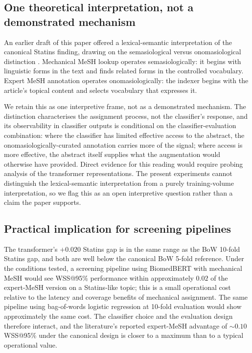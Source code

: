 \documentclass{article}
\begin{document}
\subsection{One theoretical interpretation, not a demonstrated mechanism}\label{sec:lexical}

An earlier draft of this paper offered a lexical-semantic interpretation of the canonical Statins finding, drawing on the semasiological versus onomasiological distinction \cite{baldinger1980,geeraerts2010}. Mechanical MeSH lookup operates semasiologically: it begins with linguistic forms in the text and finds related forms in the controlled vocabulary. Expert MeSH annotation operates onomasiologically: the indexer begins with the article's topical content and selects vocabulary that expresses it.

We retain this as one interpretive frame, not as a demonstrated mechanism. The distinction characterises the assignment process, not the classifier's response, and its observability in classifier outputs is conditional on the classifier-evaluation combination: where the classifier has limited effective access to the abstract, the onomasiologically-curated annotation carries more of the signal; where access is more effective, the abstract itself supplies what the augmentation would otherwise have provided. Direct evidence for this reading would require probing analysis of the transformer representations. The present experiments cannot distinguish the lexical-semantic interpretation from a purely training-volume interpretation, so we flag this as an open interpretive question rather than a claim the paper supports.

\subsection{Practical implication for screening pipelines}

The transformer's $+0.020$ Statins gap is in the same range as the BoW 10-fold Statins gap, and both are well below the canonical BoW 5-fold reference. Under the conditions tested, a screening pipeline using BiomedBERT with mechanical MeSH would see WSS@95\% performance within approximately $0.02$ of the expert-MeSH version on a Statins-like topic; this is a small operational cost relative to the latency and coverage benefits of mechanical assignment. The same pipeline using bag-of-words logistic regression at 10-fold evaluation would show approximately the same cost. The classifier choice and the evaluation design therefore interact, and the literature's reported expert-MeSH advantage of $\sim 0.10$ WSS@95\% under the canonical design is closer to a maximum than to a typical operational value.
\end{document}

